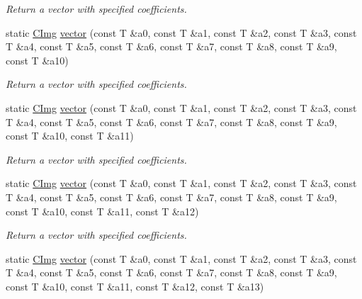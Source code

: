 \begin{DoxyCompactItemize}
\begin{DoxyCompactList}\small\item\em Return a vector with specified coefficients. \end{DoxyCompactList}\item 
\hypertarget{structcimg__library_1_1_c_img_a0e0d9986dc075c81c123d85e7f39ceba}{static \hyperlink{structcimg__library_1_1_c_img}{C\-Img} \hyperlink{structcimg__library_1_1_c_img_a0e0d9986dc075c81c123d85e7f39ceba}{vector} (const T \&a0, const T \&a1, const T \&a2, const T \&a3, const T \&a4, const T \&a5, const T \&a6, const T \&a7, const T \&a8, const T \&a9, const T \&a10)}\label{structcimg__library_1_1_c_img_a0e0d9986dc075c81c123d85e7f39ceba}

\begin{DoxyCompactList}\small\item\em Return a vector with specified coefficients. \end{DoxyCompactList}\item 
\hypertarget{structcimg__library_1_1_c_img_a8794a56eb1998190f0b367cfa1e42591}{static \hyperlink{structcimg__library_1_1_c_img}{C\-Img} \hyperlink{structcimg__library_1_1_c_img_a8794a56eb1998190f0b367cfa1e42591}{vector} (const T \&a0, const T \&a1, const T \&a2, const T \&a3, const T \&a4, const T \&a5, const T \&a6, const T \&a7, const T \&a8, const T \&a9, const T \&a10, const T \&a11)}\label{structcimg__library_1_1_c_img_a8794a56eb1998190f0b367cfa1e42591}

\begin{DoxyCompactList}\small\item\em Return a vector with specified coefficients. \end{DoxyCompactList}\item 
\hypertarget{structcimg__library_1_1_c_img_a9940956b659085ff0d51f357cbd87301}{static \hyperlink{structcimg__library_1_1_c_img}{C\-Img} \hyperlink{structcimg__library_1_1_c_img_a9940956b659085ff0d51f357cbd87301}{vector} (const T \&a0, const T \&a1, const T \&a2, const T \&a3, const T \&a4, const T \&a5, const T \&a6, const T \&a7, const T \&a8, const T \&a9, const T \&a10, const T \&a11, const T \&a12)}\label{structcimg__library_1_1_c_img_a9940956b659085ff0d51f357cbd87301}

\begin{DoxyCompactList}\small\item\em Return a vector with specified coefficients. \end{DoxyCompactList}\item 
\hypertarget{structcimg__library_1_1_c_img_a0922aa55274eac4b81ab52c6b3bea628}{static \hyperlink{structcimg__library_1_1_c_img}{C\-Img} \hyperlink{structcimg__library_1_1_c_img_a0922aa55274eac4b81ab52c6b3bea628}{vector} (const T \&a0, const T \&a1, const T \&a2, const T \&a3, const T \&a4, const T \&a5, const T \&a6, const T \&a7, const T \&a8, const T \&a9, const T \&a10, const T \&a11, const T \&a12, const T \&a13)}\label{structcimg__library_1_1_c_img_a0922aa55274eac4b81ab52c6b3bea628}


\end{DoxyCompactItemize}
